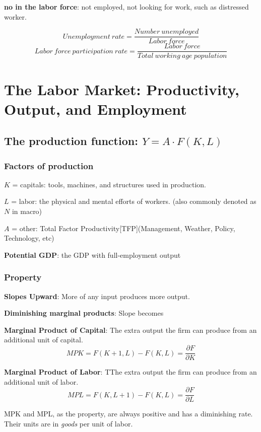 \documentclass[10pt, a4paper]{article}
\begin{document}
            \textbf{no in the labor force}: not employed, not looking for work, such as distressed worker. 

            $$Unemployment\ rate = \frac{Number\ unemployed}{Labor\ force}$$
            $$Labor\ force\ participation\ rate = \frac{Labor\ force}{Total\ working\ age\ population}$$
    
    \section{The Labor Market: Productivity, Output, and Employment}
        \subsection{The production function: $Y = A\cdot F(K, L)$}
        \subsubsection{Factors of production}
            $K$ = capitals: tools, machines, and structures used in production.
            
            $L$ = labor: the physical and mental efforts of workers. (also commonly denoted as $N$ in macro) 

            $A$ = other: Total Factor Productivity[TFP](Management, Weather, Policy, Technology, etc)
            
            \textbf{Potential GDP}: the GDP with full-employment output
        \subsubsection{Property}
            \textbf{Slopes Upward}: More of any input produces more output. 
            
            \textbf{Diminishing marginal products}: Slope becomes 
            
            \textbf{Marginal Product of Capital}: The extra output the firm can produce from an additional unit of capital. 
            $$MPK = F(K + 1, L) - F(K, L)  = \frac{\partial F}{\partial K}$$
            
            \textbf{Marginal Product of Labor}: TThe extra output the firm can produce from an additional unit of labor.  
            $$MPL = F(K, L + 1) - F(K, L) = \frac{\partial F}{\partial L}$$

            MPK and MPL, as the property, are always positive and has a diminishing rate. Their units are in \emph{goods} per unit of labor.  
\end{document}
